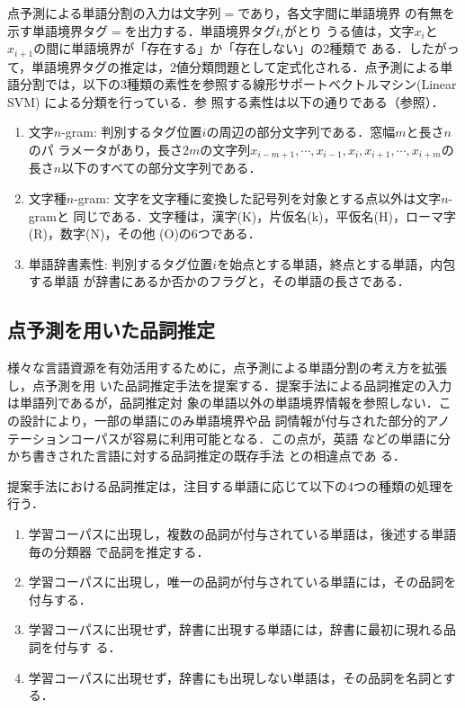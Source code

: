 \documentclass[japanese]{jnlp_1.4}
\def\Bdma#1{}
\def\Conc#1#2{}
\def\figref#1{}
\begin{document}
点予測による単語分割の入力は文字列$\Bdma{x} = \Conc{x}{n}$であり，各文字間に単語境界
の有無を示す単語境界タグ$\Bdma{t} = \Conc{t}{n-1}$を出力する．単語境界タグ$t_i$がとり
うる値は，文字$x_{i}$と$x_{i+1}$の間に単語境界が「存在する」か「存在しない」の2種類で
ある．したがって，単語境界タグの推定は，2値分類問題として定式化される．点予測による単
語分割では，以下の3種類の素性を参照する線形サポートベクトルマシン(Linear SVM)
\cite{LIBLINEAR:.A.Library.for.Large.Linear.Classification}による分類を行っている．参
照する素性は以下の通りである（\figref{figure:KyWS}参照）．
\begin{enumerate}

\item 文字$n$-gram: 判別するタグ位置$i$の周辺の部分文字列である．窓幅$m$と長さ$n$のパ
  ラメータがあり，長さ$2m$の文字列$x_{i-m+1}, \cdots, x_{i-1}, x_{i}, x_{i+1},
  \cdots, x_{i+m}$の長さ$n$以下のすべての部分文字列である．

\item 文字種$n$-gram: 文字を文字種に変換した記号列を対象とする点以外は文字$n$-gramと
  同じである．文字種は，漢字(K)，片仮名(k)，平仮名(H)，ローマ字(R)，数字(N)，その他
  (O)の6つである．

\item 単語辞書素性: 判別するタグ位置$i$を始点とする単語，終点とする単語，内包する単語
  が辞書にあるか否かのフラグと，その単語の長さである．

\end{enumerate}



\subsection{点予測を用いた品詞推定}

様々な言語資源を有効活用するために，点予測による単語分割の考え方を拡張し，点予測を用
いた品詞推定手法を提案する．提案手法による品詞推定の入力は単語列であるが，品詞推定対
象の単語以外の単語境界情報を参照しない．この設計により，一部の単語にのみ単語境界や品
詞情報が付与された部分的アノテーションコーパスが容易に利用可能となる．この点が，英語
などの単語に分かち書きされた言語に対する品詞推定の既存手法
\cite{Grammatical.Category.Disambiguation.by.Statistical.Optimization}との相違点であ
る．

提案手法における品詞推定は，注目する単語に応じて以下の4つの種類の処理を行う．
\begin{enumerate}

\item 学習コーパスに出現し，複数の品詞が付与されている単語は，後述する単語毎の分類器
  で品詞を推定する．

\item 学習コーパスに出現し，唯一の品詞が付与されている単語には，その品詞を付与する．

\item 学習コーパスに出現せず，辞書に出現する単語には，辞書に最初に現れる品詞を付与す
  る．

\item 学習コーパスに出現せず，辞書にも出現しない単語は，その品詞を名詞とする．

\end{enumerate}
\end{document}
